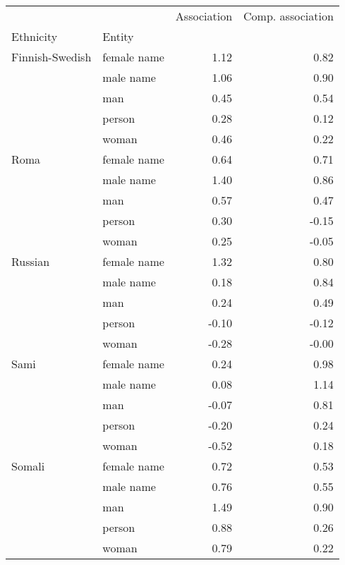 \begin{tabular}{llrr}
\toprule
       &       &  Association &  Comp. association \\
Ethnicity & Entity &              &                    \\
\midrule
Finnish-Swedish & female name &         1.12 &               0.82 \\
       & male name &         1.06 &               0.90 \\
       & man &         0.45 &               0.54 \\
       & person &         0.28 &               0.12 \\
       & woman &         0.46 &               0.22 \\
Roma & female name &         0.64 &               0.71 \\
       & male name &         1.40 &               0.86 \\
       & man &         0.57 &               0.47 \\
       & person &         0.30 &              -0.15 \\
       & woman &         0.25 &              -0.05 \\
Russian & female name &         1.32 &               0.80 \\
       & male name &         0.18 &               0.84 \\
       & man &         0.24 &               0.49 \\
       & person &        -0.10 &              -0.12 \\
       & woman &        -0.28 &              -0.00 \\
Sami & female name &         0.24 &               0.98 \\
       & male name &         0.08 &               1.14 \\
       & man &        -0.07 &               0.81 \\
       & person &        -0.20 &               0.24 \\
       & woman &        -0.52 &               0.18 \\
Somali & female name &         0.72 &               0.53 \\
       & male name &         0.76 &               0.55 \\
       & man &         1.49 &               0.90 \\
       & person &         0.88 &               0.26 \\
       & woman &         0.79 &               0.22 \\
\bottomrule
\end{tabular}
